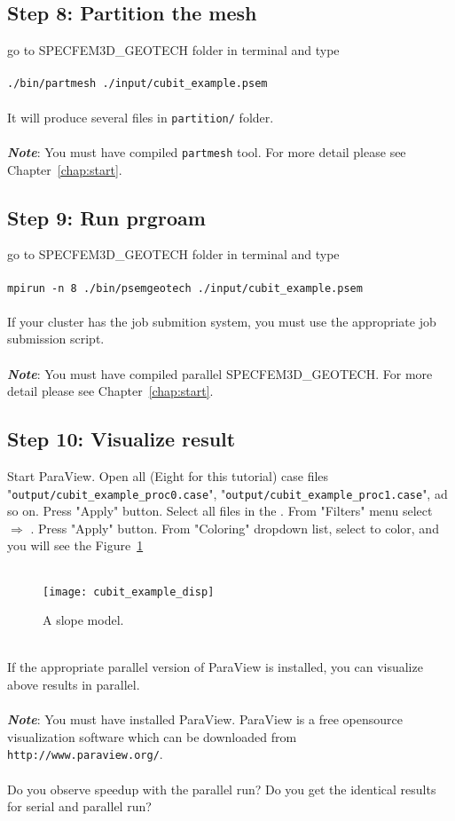 \subsection*{Step 8: Partition the mesh}

go to SPECFEM3D\_GEOTECH folder in terminal and type\\
\\
\texttt{./bin/partmesh ./input/cubit\_example.psem}\\
\\
It will produce several files in \texttt{partition/} folder.\\
\\
\textbf{\emph{Note}}: You must have compiled \texttt{partmesh} tool. For more detail please see Chapter~\ref{chap:start}.

\subsection*{Step 9: Run prgroam}

go to SPECFEM3D\_GEOTECH folder in terminal and type\\
\\
\texttt{mpirun -n 8 ./bin/psemgeotech ./input/cubit\_example.psem}\\
\\
If your cluster has the job submition system, you must use the appropriate job submission script.\\
\\

\textbf{\emph{Note}}: You must have compiled parallel SPECFEM3D\_GEOTECH. For more detail please see Chapter~\ref{chap:start}.

\subsection*{Step 10: Visualize result}

Start ParaView. Open all (Eight for this tutorial) case files "\texttt{output/cubit\_example\_proc0.case}", "\texttt{output/cubit\_example\_proc1.case}", ad so on. Press "Apply" button. Select all files in the . From "Filters" menu select  $\Rightarrow$ . Press "Apply" button. From "Coloring" dropdown list, select  to color, and you will see the Figure~\ref{fig:pardisp}\\
\\
\begin{figure}[ht]
\centering
\texttt{[image: cubit\_example\_disp]}
\caption{A slope model.}
\label{fig:pardisp}
\end{figure}
\\
If the appropriate parallel version of ParaView is installed, you can visualize above results in parallel.\\
\\
\textbf{\emph{Note}}: You must have installed ParaView. ParaView is a free opensource visualization software which
can be downloaded from \texttt{http://www.paraview.org/}.\\
\\
Do you observe speedup with the parallel run? Do you get the identical results for serial and parallel run?
